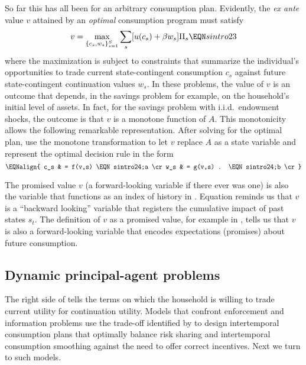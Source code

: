 So far this has all been for an arbitrary consumption plan.
Evidently, the {\it ex ante\/}
value $v$ attained by an {\it optimal\/} consumption program must
satisfy
$$ v = \max_{\{{c_s, w_s}\}_{s=1}^S} \sum_s [u(c_s) + \beta w_s ] \Pi_s
\EQN sintro23 $$ where the maximization is subject to constraints
that summarize the individual's opportunities to trade current
state-contingent consumption $c_s$ against future state-contingent
continuation values $w_s$. In these problems, the value of $v$ is
an outcome that depends, in the savings problem for example, on
the household's initial level of assets. In fact, for the savings
problem with i.i.d.\ endowment shocks, the outcome is that $v$ is
a monotone function of $A$. This monotonicity allows the following
remarkable representation. After solving for the optimal plan, use
the monotone transformation to let $v$ replace $A$ as a state
variable and represent the optimal decision rule in the form
$$\EQNalign{ c_s & =   f(v,s) \EQN sintro24;a \cr
             w_s & =  g(v,s) . \EQN sintro24;b \cr} $$

The promised value $v$ (a forward-looking variable if there ever was one)
 is also the variable that
functions as an index of history  in .  Equation
  reminds us that   $v$ is a  ``backward looking'' variable
that registers the cumulative impact of past   states $s_t$.
The definition of $v$ as a promised value,  for example in
, tells us that $v$ is also a forward-looking variable
that encodes expectations (promises)  about future consumption.



\subsection{Dynamic principal-agent problems}
The right side of   tells the terms on which
the  household is willing
to trade
current utility for continuation utility.
Models that confront enforcement and information problems use the
trade-off identified by  to design intertemporal
consumption plans that optimally balance risk sharing  and intertemporal
consumption smoothing against the need to offer correct incentives.
Next we turn to such models.



